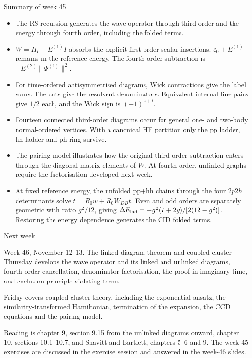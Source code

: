 \documentclass[aspectratio=169,10pt]{beamer}
\begin{document}
\begin{frame}[shrink=8]{Summary of week 45}
\begin{itemize}
\item The RS recursion generates the wave operator through third order and the energy through fourth order, including the folded terms.
\item $W=H_I-E^{(1)}I$ absorbs the explicit first-order scalar insertions. $\varepsilon_0+E^{(1)}$ remains in the reference energy. The fourth-order subtraction is $-E^{(2)}\|\Psi^{(1)}\|^2$.
\item For time-ordered antisymmetrised diagrams, Wick contractions give the label sums. The cuts give the resolvent denominators. Equivalent internal line pairs give $1/2$ each, and the Wick sign is $(-1)^{h+l}$.
\item Fourteen connected third-order diagrams occur for general one- and two-body normal-ordered vertices. With a canonical HF partition only the pp ladder, hh ladder and ph ring survive.
\item The pairing model illustrates how the original third-order subtraction enters through the diagonal matrix elements of $W$. At fourth order, unlinked graphs require the factorisation developed next week.
\item At fixed reference energy, the unfolded pp+hh chains through the four $2p2h$ determinants solve $t=R_0w+R_0W_{DD}t$. Even and odd orders are separately geometric with ratio $g^2/12$, giving $\Delta E_{\rm lad}=-g^2(7+2g)/[2(12-g^2)]$. Restoring the energy dependence generates the CID folded terms.
\end{itemize}
\end{frame}

\begin{frame}{Next week}
\begin{exampleblock}{Week 46, November 12--13. The linked-diagram theorem and coupled cluster}
Thursday develops the wave operator and its linked and unlinked diagrams, fourth-order cancellation, denominator factorisation, the proof in imaginary time, and exclusion-principle-violating terms.
\medskip

Friday covers coupled-cluster theory, including the exponential ansatz, the similarity-transformed Hamiltonian, termination of the expansion, the CCD equations and the pairing model.
\end{exampleblock}
\medskip

Reading is chapter 9, section 9.15 from the unlinked diagrams onward, chapter 10, sections 10.1--10.7, and Shavitt and Bartlett, chapters 5--6 and 9. The week-45 exercises are discussed in the exercise session and answered in the week-46 slides.
\end{frame}
\end{document}
